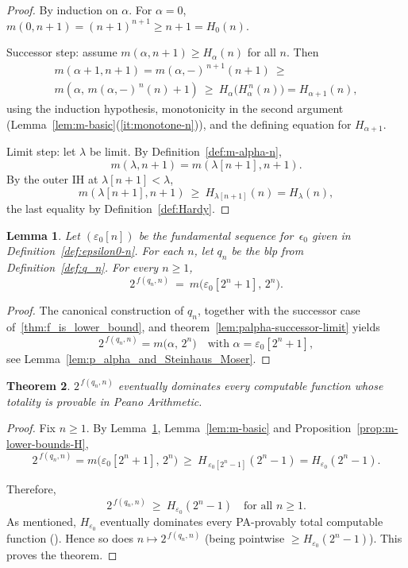 \documentclass{article}
\newtheorem{lemma}{Lemma}[section]
\newtheorem{theorem}[lemma]{Theorem}
\theoremstyle{definition}
\theoremstyle{remark}
\begin{document}
\begin{proof}
By induction on $\alpha$. For $\alpha=0$,
$m(0,n+1)=(n+1)^{n+1}\ge n+1=H_0(n)$. 

Successor step: assume $m(\alpha,n+1)\ge H_\alpha(n)$ for all $n$. Then
\begin{multline*}
  m(\alpha+1,n+1)= m(\alpha,-)^{\,n+1}(n+1)
\  \ge\ \\  m(\alpha,\,m(\alpha,-)^{\,n}(n)+1)
\ \ge\ H_\alpha\!\bigl( H_\alpha^{\,n}(n)\bigr)
= H_{\alpha+1}(n),
\end{multline*}
using the induction hypothesis, monotonicity in the second argument (Lemma~\ref{lem:m-basic}(\ref{it:monotone-n})), and the defining equation for $H_{\alpha+1}$.

Limit step: let $\lambda$ be limit. By Definition~\ref{def:m-alpha-n}, 
\[
m(\lambda,n+1)=m(\lambda[n+1],n+1).
\]
By the outer IH at $\lambda[n+1]<\lambda$,
\[
m(\lambda[n+1],n+1)\ \ge\ H_{\lambda[n+1]}(n)
= H_\lambda(n),
\]
the last equality by Definition~\ref{def:Hardy}.
\end{proof}

\begin{lemma}\label{lem:e-tower}
Let $(\varepsilon_0[n])$ be the fundamental sequence for~$\epsilon_0$ given in Definition~\ref{def:epsilon0-n}. For each $n$, let $q_n$ be the blp from Definition~\ref{def:q_n}. For every $n\ge 1$,
\[
2^{\,f(q_n,n)}\ =\ m\!\bigl(\varepsilon_0[2^n+1],\,2^n\bigr).
\]
\end{lemma}

\begin{proof}
The canonical construction of $q_n$, together with the successor case of~\ref{thm:f_is_lower_bound}, and theorem~\ref{lem:palpha-successor-limit}
yields 
\[
2^{\,f(q_n,n)}=m\bigl(\alpha,\,2^n\bigr)\quad\text{with }\alpha=\varepsilon_0[2^n+1],
\]
see Lemma~\ref{lem:p_alpha_and_Steinhaus_Moser}.
\end{proof}

\begin{theorem}\label{thm:PA-dominates}
$2^{\,f(q_n,n)}$ eventually dominates every computable function whose totality is provable in Peano Arithmetic.
\end{theorem}

\begin{proof}
Fix $n\ge 1$. By Lemma~\ref{lem:e-tower}, Lemma~\ref{lem:m-basic} and Proposition~\ref{prop:m-lower-bounds-H},
\[
2^{\,f(q_n,n)} 
= m\!\bigl(\varepsilon_0[2^n+1],\,2^n\bigr)
\ \ge\ H_{\,\varepsilon_0[2^n-1]}(2^n-1) = H_{\varepsilon_0}(2^n-1).
\]

Therefore,
\[
2^{\,f(q_n,n)}\ \ge\ H_{\varepsilon_0}(2^n-1)\quad\text{for all }n\ge 1.
\]
As mentioned, $H_{\varepsilon_0}$ eventually dominates every PA-provably total computable function (\cite{Weiermann}). Hence so does $n\mapsto 2^{\,f(q_n,n)}$ (being pointwise $\ge H_{\varepsilon_0}(2^n-1)$). This proves the theorem.
\end{proof}
\end{document}
